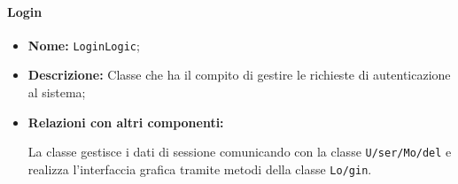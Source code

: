 \paragraph{Login}
\begin{flushleft}
\begin{itemize}
\item \textbf{Nome:} \texttt{LoginLogic};
\item \textbf{Descrizione:} Classe che ha il compito di gestire le richieste di autenticazione al sistema;
\item \textbf{Relazioni con altri componenti:}
\begin{sloppypar}
La classe gestisce i dati di sessione comunicando con la classe \texttt{\model{}U\fshyp{}ser\fshyp{}Mo\fshyp{}del} e realizza l'interfaccia grafica tramite metodi della classe \texttt{\view{}Lo\fshyp{}gin}.
\end{sloppypar}
\end{itemize}
\end{flushleft}



